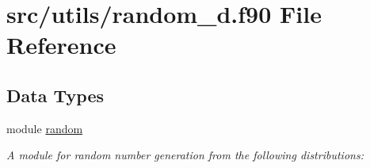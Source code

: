 \hypertarget{random__d_8f90}{\section{src/utils/random\-\_\-d.f90 File Reference}
\label{random__d_8f90}
}
\subsection*{Data Types}
\begin{DoxyCompactItemize}
\item 
module \hyperlink{classrandom}{random}
\begin{DoxyCompactList}\small\item\em A module for random number generation from the following distributions\-: \end{DoxyCompactList}\end{DoxyCompactItemize}

